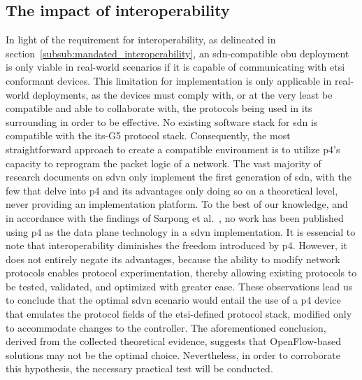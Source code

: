\subsection{The impact of interoperability}
In light of the requirement for interoperability, as delineated in section~\ref{subsub:mandated_interoperability}, an \gls{sdn}-compatible \gls{obu} deployment is only viable in real-world scenarios if it is capable of communicating with \gls{etsi} conformant devices. This limitation for implementation is only applicable in real-world deployments, as the devices must comply with, or at the very least be compatible and able to collaborate with, the protocols being used in its surrounding in order to be effective. No existing software stack for \gls{sdn} is compatible with the \gls{its}-G5 protocol stack. Consequently, the most straightforward approach to create a compatible environment is to utilize \gls{p4}’s capacity to reprogram the packet logic of a network. 
The vast majority of research documents on \gls{sdvn} only implement the first generation of \gls{sdn}, with the few that delve into \gls{p4} and its advantages only doing so on a theoretical level, never providing an implementation platform. To the best of our knowledge, and in accordance with the findings of Sarpong et al.~\cite{sarpong_potential_2023}, no work has been published using \gls{p4} as the data plane technology in a \gls{sdvn} implementation. 
It is essencial to note that interoperability diminishes the freedom introduced by \gls{p4}. However, it does not entirely negate its advantages, because the ability to modify network protocols enables protocol experimentation, thereby allowing existing protocols to be tested, validated, and optimized with greater ease.
These observations lead us to conclude that the optimal \gls{sdvn} scenario would entail the use of a \gls{p4} device that emulates the protocol fields of the \gls{etsi}-defined protocol stack, modified only to accommodate changes to the controller. The aforementioned conclusion, derived from the collected theoretical evidence, suggests that OpenFlow-based solutions may not be the optimal choice. Nevertheless, in order to corroborate this hypothesis, the necessary practical test will be conducted.
